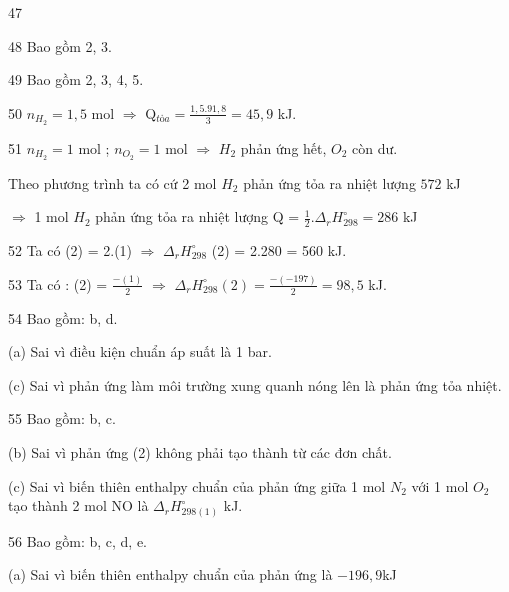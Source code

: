 \def\writeANS{}
\begin{loigiaibth}{47}

\end{loigiaibth}
\def\writeANS{}
\begin{loigiaibth}{48}
 Bao gồm 2, 3.
\end{loigiaibth}
\def\writeANS{}
\begin{loigiaibth}{49}
 Bao gồm 2, 3, 4, 5.
\end{loigiaibth}
\def\writeANS{}
\begin{loigiaibth}{50}
  $n_{H_2} = 1{,}5$ mol $\Rightarrow $ Q$_{tỏa} = \frac {1{,}5.91{,}8}{3} = 45{,}9$ kJ.
\end{loigiaibth}
\def\writeANS{}
\begin{loigiaibth}{51}
  $n_{H_2} = 1$ mol ; $n_{O_2} = 1$ mol $\Rightarrow $ $H_2$ phản ứng hết, $O_2$ còn dư. \par Theo phương trình ta có cứ 2 mol $H_2$ phản ứng tỏa ra nhiệt lượng $572$ kJ \par $\Rightarrow $ 1 mol $H_2$ phản ứng tỏa ra nhiệt lượng Q = $\frac {1}{2}.\Delta _r H_{298}^\circ = 286$ kJ
\end{loigiaibth}
\def\writeANS{}
\begin{loigiaibth}{52}
  Ta có (2) = 2.(1) $\Rightarrow $ $\Delta _r H_{298}^\circ $ (2) = 2.280 = 560 kJ.
\end{loigiaibth}
\def\writeANS{}
\begin{loigiaibth}{53}
  Ta có : (2) = $\frac {-(1)}{2}$ $\Rightarrow $ $\Delta _r H_{298}^\circ (2) = \frac {-(-197)}{2} = 98{,}5$ kJ.
\end{loigiaibth}
\def\writeANS{}
\begin{loigiaibth}{54}
 Bao gồm: b, d. \par (a) Sai vì điều kiện chuẩn áp suất là 1 bar. \par (c) Sai vì phản ứng làm môi trường xung quanh nóng lên là phản ứng tỏa nhiệt.
\end{loigiaibth}
\def\writeANS{}
\begin{loigiaibth}{55}
 Bao gồm: b, c. \par (b) Sai vì phản ứng (2) không phải tạo thành từ các đơn chất. \par (c) Sai vì biến thiên enthalpy chuẩn của phản ứng giữa 1 mol $N_2$ với 1 mol $O_2$ tạo thành 2 mol NO là $\Delta _r H_{298(1)}^\circ $ kJ.
\end{loigiaibth}
\def\writeANS{}
\begin{loigiaibth}{56}
 Bao gồm: b, c, d, e. \par (a) Sai vì biến thiên enthalpy chuẩn của phản ứng là $-196{,}9$kJ
\end{loigiaibth}
